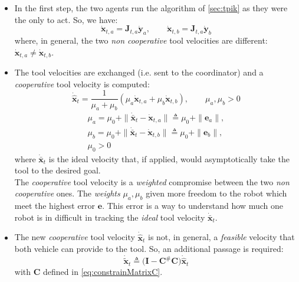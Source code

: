\begin{itemize}
	\item In the first step, the two agents run the algorithm of \ref{sec:tpik} as they were the only to act. So, we have:
	\begin{equation}
		\dot{\boldsymbol{x}}_{t,a} = \boldsymbol{J}_{t,a} \dot{\boldsymbol{y}}_{a} , \qquad 
		\dot{\boldsymbol{x}}_{t,b} = \boldsymbol{J}_{t,a} \dot{\boldsymbol{y}}_{b}	
	\end{equation}
	where, in general, the two \textit{non cooperative} tool velocities are different: $\dot{\boldsymbol{x}}_{t,a} \neq \dot{\boldsymbol{x}}_{t,b}$.
	
	\item The tool velocities are exchanged (i.e. sent to the coordinator) and a \textit{cooperative} tool velocity is computed:
	\begin{equation}\label{eq:weightsum}
		\dot{\hat{\boldsymbol{x}}}_t = \dfrac{1}{\mu_a + \mu_b} (\mu_a \dot{\boldsymbol{x}}_{t,a}  + \mu_b \dot{\boldsymbol{x}}_{t,b}), \qquad
		\mu_a , \mu_b > 0	
	\end{equation}
    \begin{equation}
		\begin{gathered}
			\mu_a = \mu_0 + \| \dot{\bar{\boldsymbol{x}}}_t - \dot{\boldsymbol{x}}_{t,a} \| \triangleq \mu_0 + \| \boldsymbol{e}_a \|, \\
			\mu_b = \mu_0 + \| \dot{\bar{\boldsymbol{x}}}_t - \dot{\boldsymbol{x}}_{t,b} \| \triangleq \mu_0 + \| \boldsymbol{e}_b \|, \\
			\mu_0 > 0
	    \end{gathered}
	\end{equation}
	where $\dot{\bar{\boldsymbol{x}}}_t$ is the ideal velocity that, if applied, would asymptotically take the tool to the desired goal.\\
	The \textit{cooperative} tool velocity is a \textit{weighted} compromise between the two \textit{non cooperative} ones. The \textit{weights} $\mu_a, \mu_b$ given more freedom to the robot which meet the highest error $\boldsymbol{e}$. This error is a way to understand how much one robot is in difficult in tracking the \textit{ideal} tool velocity $\dot{\bar{\boldsymbol{x}}}_t$.
	
	\item The new \textit{cooperative} tool velocity $\dot{\hat{\boldsymbol{x}}}_t$ is not, in general, a \textit{feasible} velocity that both vehicle can provide to the tool. So, an additional passage is required:
	\begin{equation}
		\dot{\tilde{\boldsymbol{x}}}_t \triangleq \big( \boldsymbol{I} - \boldsymbol{C}^\# \boldsymbol{C} \big) \dot{\hat{\boldsymbol{x}}}_t
	\end{equation}
	with $\boldsymbol{C}$ defined in \eqref{eq:constrainMatrixC}.
	

\end{itemize}
